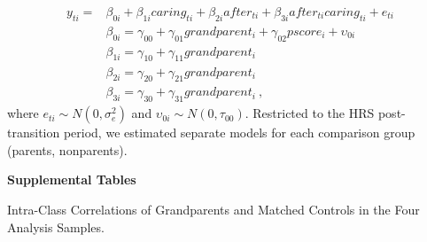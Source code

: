 \documentclass[
  english,
  man, noextraspace]{apa7}
\begin{document}
\begin{appendix}
\begin{equation}
\begin{split}
y_{ti} =& \beta_{0i} + \beta_{1i}caring_{ti} + \beta_{2i}after_{ti} + \beta_{3i}after_{ti}caring_{ti} + e_{ti} \\
& \beta_{0i} = \gamma_{00} + \gamma_{01}grandparent_i + \gamma_{02}pscore_i + \upsilon_{0i} \\
& \beta_{1i} = \gamma_{10} + \gamma_{11}grandparent_i \\
& \beta_{2i} = \gamma_{20} + \gamma_{21}grandparent_i \\
& \beta_{3i} = \gamma_{30} + \gamma_{31}grandparent_i\ ,
\end{split}
\label{eq:mlm4}
\end{equation} where \(e_{ti} \sim N(0, \sigma_e^2)\) and
\(\upsilon_{0i} \sim N(0, \tau_{00})\). Restricted to the HRS
post-transition period, we estimated separate models for each comparison
group (parents, nonparents).

\newpage

\noindent \textbf{Supplemental Tables}

\begin{table}[h]

\begin{center}
\begin{threeparttable}

\caption{\label{tab:icc-table}Intra-Class Correlations of Grandparents and Matched Controls in the Four Analysis Samples.}


\end{threeparttable}
\end{center}
\end{table}
\end{appendix}
\end{document}
